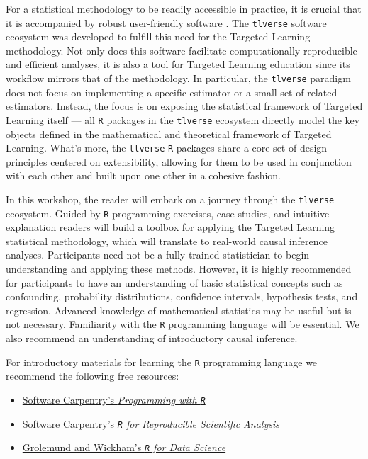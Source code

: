 \documentclass[
  12pt, krantz2,
]{book}
\newcommand{\passthrough}[1]{#1}
\providecommand{\tightlist}{%
  \setlength{\itemsep}{0pt}\setlength{\parskip}{0pt}}
\theoremstyle{definition}
\theoremstyle{definition}
\theoremstyle{definition}
\newcommand{\1}{\mathbbm{1}}
\begin{document}
For a statistical methodology to be readily accessible in practice, it is
crucial that it is accompanied by robust user-friendly software
\citep{pullenayegum2016knowledge, stromberg2004write}. The \passthrough{\lstinline!tlverse!} software
ecosystem was developed to fulfill this need for the Targeted Learning
methodology. Not only does this software facilitate computationally reproducible
and efficient analyses, it is also a tool for Targeted Learning education since
its workflow mirrors that of the methodology. In particular, the \passthrough{\lstinline!tlverse!}
paradigm does not focus on implementing a specific estimator or a small set of
related estimators. Instead, the focus is on exposing the statistical framework
of Targeted Learning itself --- all \passthrough{\lstinline!R!} packages in the \passthrough{\lstinline!tlverse!} ecosystem
directly model the key objects defined in the mathematical and theoretical
framework of Targeted Learning. What's more, the \passthrough{\lstinline!tlverse!} \passthrough{\lstinline!R!} packages share a
core set of design principles centered on extensibility, allowing for them to be
used in conjunction with each other and built upon one other in a cohesive
fashion.

In this workshop, the reader will embark on a journey through the \passthrough{\lstinline!tlverse!}
ecosystem. Guided by \passthrough{\lstinline!R!} programming exercises, case studies, and
intuitive explanation readers will build a toolbox for applying the Targeted
Learning statistical methodology, which will translate to real-world causal
inference analyses. Participants need not be a fully trained statistician to
begin understanding and applying these methods. However, it is highly
recommended for participants to have an understanding of basic statistical
concepts such as confounding, probability distributions, confidence intervals,
hypothesis tests, and regression. Advanced knowledge of mathematical statistics
may be useful but is not necessary. Familiarity with the \passthrough{\lstinline!R!} programming
language will be essential. We also recommend an understanding of introductory
causal inference.

For introductory materials for learning the \passthrough{\lstinline!R!} programming language we recommend the following free resources:

\begin{itemize}
\tightlist
\item
  \href{http://swcarpentry.github.io/r-novice-inflammation/}{Software Carpentry's \emph{Programming with
  \passthrough{\lstinline!R!}}}
\item
  \href{http://swcarpentry.github.io/r-novice-gapminder/}{Software Carpentry's \emph{\passthrough{\lstinline!R!} for Reproducible Scientific
  Analysis}}
\item
  \href{https://r4ds.had.co.nz}{Grolemund and Wickham's \emph{\passthrough{\lstinline!R!} for Data
  Science}}
\end{itemize}
\end{document}
